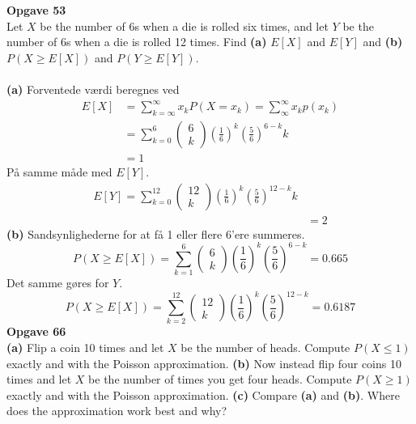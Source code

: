 \documentclass[12pt,a4paper,draft]{report}
\author{Frederik Appel Vardinghus-Nielsen}
\begin{document}
\noindent\textbf{Opgave 53}\\
Let $X$ be the number of 6s when a die is rolled six times, and let $Y$ be the number of 6s when a die is rolled 12 times. Find \textbf{(a)} $E[X]$ and $E[Y]$ and \textbf{(b)} $P(X\geq E[X])$ and $P(Y\geq E[Y])$.\\\\
\textbf{(a)} Forventede værdi beregnes ved\
\begin{align*}
E[X]&=\sum_{k=\infty}^{\infty}x_kP(X=x_k)=\sum_{\infty}^{\infty}x_kp(x_k)\\
&=\sum_{k=0}^6\begin{pmatrix}
6\\k
\end{pmatrix}
\left(\frac{1}{6}\right)^k\left(\frac{5}{6}\right)^{6-k}k\\
&=1
\end{align*}
På samme måde med $E[Y]$.
\begin{align*}
E[Y]=\sum_{k=0}^{12}\begin{pmatrix}
12\\k
\end{pmatrix}
\left(\frac{1}{6}\right)^k\left(\frac{5}{6}\right)^{12-k}k\\
&=2
\end{align*}
\textbf{(b)} Sandsynlighederne for at få 1 eller flere 6'ere summeres.
\begin{equation}
P(X\geq E[X])=\sum_{k=1}^6\begin{pmatrix}
6\\k
\end{pmatrix}
\left(\frac{1}{6}\right)^k\left(\frac{5}{6}\right)^{6-k}=0.665
\end{equation}
Det samme gøres for $Y$.
\begin{equation}
P(X\geq E[X])=\sum_{k=2}^{12}\begin{pmatrix}
12\\k
\end{pmatrix}
\left(\frac{1}{6}\right)^k\left(\frac{5}{6}\right)^{12-k}=0.6187
\end{equation}
\textbf{Opgave 66}\\
\textbf{(a)} Flip a coin 10 times and let $X$ be the number of heads. Compute $P(X\leq 1)$
exactly and with the Poisson approximation. \textbf{(b)} Now instead flip four coins 10
times and let $X$ be the number of times you get four heads. Compute $P(X\geq 1)$
exactly and with the Poisson approximation. \textbf{(c)} Compare \textbf{(a)} and \textbf{(b)}. Where does the approximation work best and why?\\\\
\end{document}
